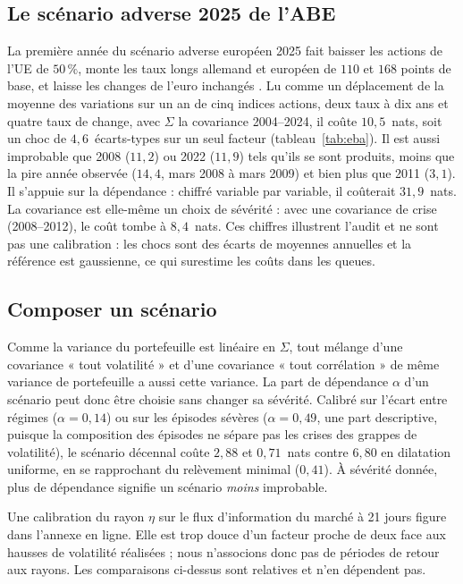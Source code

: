 \documentclass[12pt]{article}
\theoremstyle{definition}
\begin{document}
\begin{doublespace}
\subsection{Le scénario adverse 2025 de l'ABE}

La première année du scénario adverse européen 2025 fait baisser les actions
de l'UE de $50\,\%$, monte les taux longs allemand et européen de $110$ et
$168$ points de base, et laisse les changes de l'euro inchangés
\citep{eba2025}. Lu comme un déplacement de la moyenne des variations sur un
an de cinq indices actions, deux taux à dix ans et quatre taux de change,
avec $\Sigma$ la covariance 2004--2024, il coûte $10{,}5$~nats, soit un choc
de $4{,}6$~écarts-types sur un seul facteur (tableau~\ref{tab:eba}). Il est
aussi improbable que 2008 ($11{,}2$) ou 2022 ($11{,}9$) tels qu'ils se sont
produits, moins que la pire année observée ($14{,}4$, mars 2008 à mars 2009) et
bien plus que 2011 ($3{,}1$). Il s'appuie sur la dépendance : chiffré variable
par variable, il coûterait $31{,}9$~nats. La covariance est elle-même un choix
de sévérité : avec une covariance de crise (2008--2012), le coût tombe à
$8{,}4$~nats. Ces chiffres illustrent l'audit et ne sont pas une calibration :
les chocs sont des écarts de moyennes annuelles et la référence est
gaussienne, ce qui surestime les coûts dans les queues.

\subsection{Composer un scénario}

Comme la variance du portefeuille est linéaire en $\Sigma$, tout mélange d'une
covariance « tout volatilité » et d'une covariance « tout corrélation » de
même variance de portefeuille a aussi cette variance. La part de dépendance
$\alpha$ d'un scénario peut donc être choisie sans changer sa sévérité.
Calibré sur l'écart entre régimes ($\alpha=0{,}14$) ou sur les épisodes sévères
($\alpha=0{,}49$, une part descriptive, puisque la composition des épisodes ne
sépare pas les crises des grappes de volatilité), le scénario décennal coûte $2{,}88$ et $0{,}71$~nats contre
$6{,}80$ en dilatation uniforme, en se rapprochant du relèvement minimal
($0{,}41$). À sévérité donnée, plus de dépendance signifie un scénario
\emph{moins} improbable.

Une calibration du rayon $\eta$ sur le flux d'information du marché à 21 jours
figure dans l'annexe en ligne. Elle est trop douce d'un facteur proche de deux
face aux hausses de volatilité réalisées ; nous n'associons donc pas de
périodes de retour aux rayons. Les comparaisons ci-dessus sont relatives et
n'en dépendent pas.


\end{doublespace}
\end{document}
